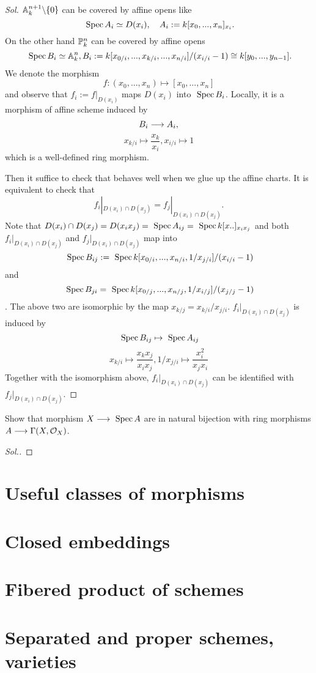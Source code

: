 \documentclass[11pt]{book} %
\begin{document}
\begin{proof}[Sol]
$\mathbb A^{n+1}_k\backslash \{0\}$ can be covered by affine opens like
$$
\text{ Spec\,} A_i\simeq D(x_i),\ \ \  A_i:= k[x_0,...,x_n]_{x_i}.
$$
On the other hand $\mathbb P^{n}_{k}$ can be covered by affine opens
$$
\text{ Spec\,} B_i\simeq \mathbb A^{n}_{k}, B_i:=k[x_{0/i},...,x_{k/i},...,x_{n/i}]/(x_{i/i}-1)\cong k[y_0,...,y_{n-1}].
$$
We denote the morphism 
$$
f:(x_0,...,x_n)\mapsto [x_0,...,x_n]
$$
and observe that $f_i:=f|_{D(x_i)}$ maps $D(x_i)$ into $\text{ Spec\,} B_i$. Locally, it is a morphism of affine scheme induced by 
$$
B_i\longrightarrow A_i,
$$
$$
x_{k/i}\mapsto \frac{x_{k}}{x_i}, x_{i/i}\mapsto 1
$$
which is a well-defined ring morphism.

Then it suffice to check that behaves well when we glue up the affine charts. It is equivalent to check that
$$
f_i|_{D(x_i)\cap D(x_j)}=f_j|_{D(x_i)\cap D(x_j)}.
$$
Note that $D(x_i)\cap D(x_j)=D(x_i x_j)=\text{ Spec\,} A_{ij}=\text{ Spec\,} k[x..]_{x_i x_j}$ and both $f_i|_{D(x_i)\cap D(x_j)}$ and $f_j|_{D(x_i)\cap D(x_j)}$ map into $$\text{ Spec\,} B_{ij}:=\text{ Spec\,} k[x_{0/i},...,x_{n/i}, 1/x_{j/i}]/(x_{i/i}-1)$$ and $$\text{ Spec\,} B_{ji}=\text{ Spec\,} k[x_{0/j},...,x_{n/j},1/x_{i/j}]/(x_{j/j}-1)$$.
The above two are isomorphic by the map $x_{k/j}=x_{k/i}/x_{j/i}$.
$
f_i|_{D(x_i)\cap D(x_j)}
$
is induced by
$$
\text{ Spec\,} B_{ij}\mapsto \text{ Spec\,} A_{ij}
$$
$$
x_{k/i}\mapsto \frac{x_k x_j}{x_i x_j},1/x_{j/i}\mapsto \frac{x_i^2}{x_j x_i}
$$
Together with the isomorphism above, $f_i|_{D(x_i)\cap D(x_j)}$ can be identified with $f_j|_{D(x_i)\cap D(x_j)}$.
\end{proof}
\begin{exr}
Show that morphism $X\longrightarrow \text{ Spec\,} A$ are in natural bijection with ring morphisms $A\longrightarrow \Gamma(X,{\cal O}_X)$.
\end{exr}
\begin{proof}[Sol.]

\end{proof}
\chapter{Useful classes of morphisms}
\chapter{Closed embeddings}
\chapter{Fibered product of schemes}
\chapter{Separated and proper schemes, varieties}
\end{document}
